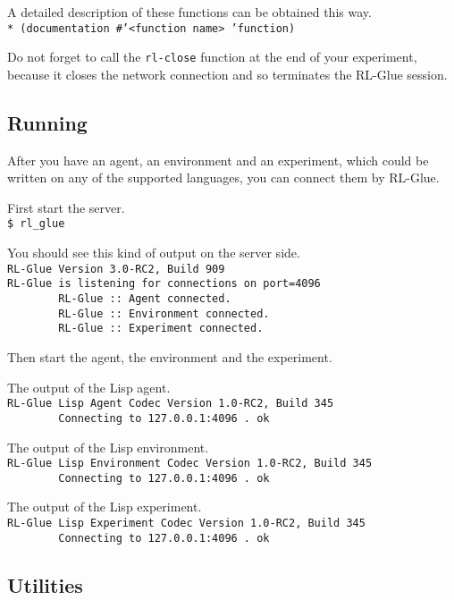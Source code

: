 \documentclass[11pt,a4paper,dvipdfm]{article}
\newcommand{\prompttext}[1]{\texttt{#1}}
\newcommand{\shprompt}[1]{\prompttext{\$ #1}}
\newcommand{\lispprompt}[1]{\prompttext{* #1}}
\begin{document}
A detailed description of these functions can be obtained this way. \\
\lispprompt{(documentation \#'<function name> 'function)}

Do not forget to call the \prompttext{rl-close} function at the end of your
experiment, because it closes the network connection and so terminates the
RL-Glue session.

\subsection{Running}

After you have an agent, an environment and an experiment, which could be
written on any of the supported languages, you can connect them by RL-Glue.

First start the server. \\
\shprompt{rl\_glue}

You should see this kind of output on the server side. \\
\prompttext{RL-Glue Version 3.0-RC2, Build 909 \\
RL-Glue is listening for connections on port=4096 \\
\mbox{~~~~~~~~}RL-Glue ::~Agent connected. \\
\mbox{~~~~~~~~}RL-Glue ::~Environment connected. \\
\mbox{~~~~~~~~}RL-Glue ::~Experiment connected.}

Then start the agent, the environment and the experiment.

The output of the Lisp agent. \\
\prompttext{RL-Glue Lisp Agent Codec Version 1.0-RC2, Build 345 \\
\mbox{~~~~~~~~}Connecting to 127.0.0.1:4096 .~ok}

The output of the Lisp environment. \\
\prompttext{RL-Glue Lisp Environment Codec Version 1.0-RC2, Build 345 \\
\mbox{~~~~~~~~}Connecting to 127.0.0.1:4096 .~ok}

The output of the Lisp experiment. \\
\prompttext{RL-Glue Lisp Experiment Codec Version 1.0-RC2, Build 345 \\
\mbox{~~~~~~~~}Connecting to 127.0.0.1:4096 .~ok}

\hypertarget{rlutils}{\subsection{Utilities}}
\end{document}

